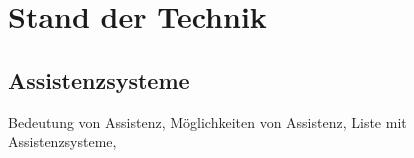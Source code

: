 
\chapter{Stand der Technik}
\label{sec:StandDerTechnik}


\section{Assistenzsysteme}

Bedeutung von Assistenz, Möglichkeiten von Assistenz, Liste mit Assistenzsysteme, 
